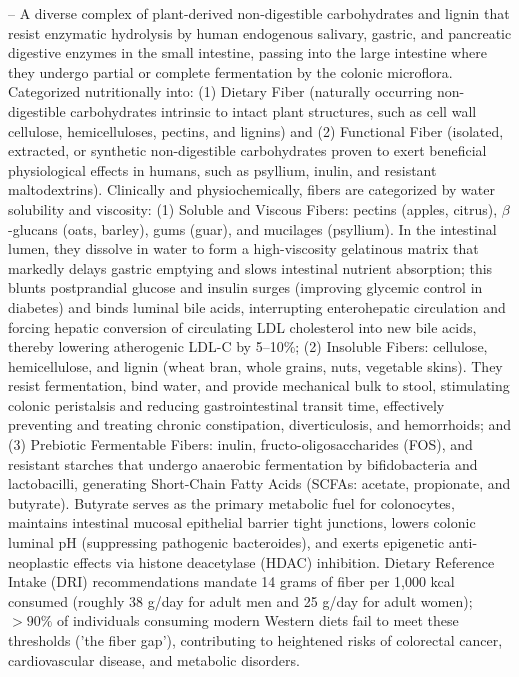-- A diverse complex of plant-derived non-digestible carbohydrates and lignin that resist enzymatic hydrolysis by human endogenous salivary, gastric, and pancreatic digestive enzymes in the small intestine, passing into the large intestine where they undergo partial or complete fermentation by the colonic microflora. Categorized nutritionally into: (1) Dietary Fiber (naturally occurring non-digestible carbohydrates intrinsic to intact plant structures, such as cell wall cellulose, hemicelluloses, pectins, and lignins) and (2) Functional Fiber (isolated, extracted, or synthetic non-digestible carbohydrates proven to exert beneficial physiological effects in humans, such as psyllium, inulin, and resistant maltodextrins). Clinically and physiochemically, fibers are categorized by water solubility and viscosity: (1) Soluble and Viscous Fibers: pectins (apples, citrus), $\beta$-glucans (oats, barley), gums (guar), and mucilages (psyllium). In the intestinal lumen, they dissolve in water to form a high-viscosity gelatinous matrix that markedly delays gastric emptying and slows intestinal nutrient absorption; this blunts postprandial glucose and insulin surges (improving glycemic control in diabetes) and binds luminal bile acids, interrupting enterohepatic circulation and forcing hepatic conversion of circulating LDL cholesterol into new bile acids, thereby lowering atherogenic LDL-C by 5--10\%; (2) Insoluble Fibers: cellulose, hemicellulose, and lignin (wheat bran, whole grains, nuts, vegetable skins). They resist fermentation, bind water, and provide mechanical bulk to stool, stimulating colonic peristalsis and reducing gastrointestinal transit time, effectively preventing and treating chronic constipation, diverticulosis, and hemorrhoids; and (3) Prebiotic Fermentable Fibers: inulin, fructo-oligosaccharides (FOS), and resistant starches that undergo anaerobic fermentation by bifidobacteria and lactobacilli, generating Short-Chain Fatty Acids (SCFAs: acetate, propionate, and butyrate). Butyrate serves as the primary metabolic fuel for colonocytes, maintains intestinal mucosal epithelial barrier tight junctions, lowers colonic luminal pH (suppressing pathogenic bacteroides), and exerts epigenetic anti-neoplastic effects via histone deacetylase (HDAC) inhibition. Dietary Reference Intake (DRI) recommendations mandate 14 grams of fiber per 1,000 kcal consumed (roughly 38 g/day for adult men and 25 g/day for adult women); $>90\%$ of individuals consuming modern Western diets fail to meet these thresholds ('the fiber gap'), contributing to heightened risks of colorectal cancer, cardiovascular disease, and metabolic disorders.

